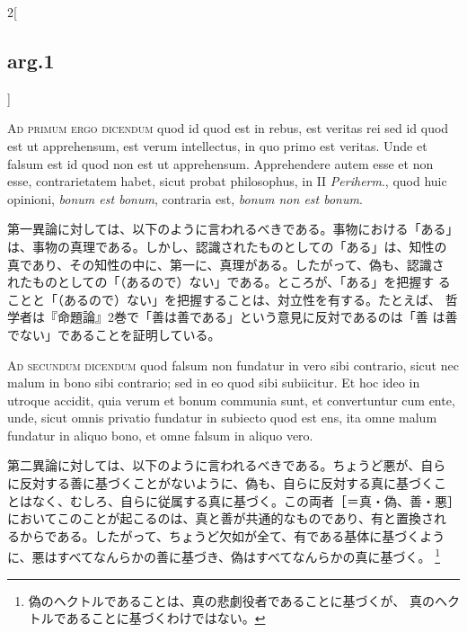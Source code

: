 \documentclass[paper=a4paper,fontsize=10pt,jafontsize=9pt,titlepage]{jlreq}
\begin{document}
\begin{paracol}{2}[\subsection{arg.1}]
\switchcolumn*[\subsection{ad.1}]


{\scshape Ad primum ergo dicendum} quod id quod est in rebus, est
 veritas rei sed id quod est ut apprehensum, est verum intellectus, in
 quo primo est veritas. Unde et falsum est id quod non est ut
 apprehensum. Apprehendere autem esse et non esse, contrarietatem
 habet, sicut probat philosophus, in II {\itshape Periherm}., quod
 huic opinioni, {\itshape bonum est bonum}, contraria est, {\itshape
 bonum non est bonum}.

\switchcolumn

第一異論に対しては、以下のように言われるべきである。事物における「ある」
は、事物の真理である。しかし、認識されたものとしての「ある」は、知性の
真であり、その知性の中に、第一に、真理がある。したがって、偽も、認識さ
れたものとしての「（あるので）ない」である。ところが、「ある」を把握す
ることと「（あるので）ない」を把握することは、対立性を有する。たとえば、
哲学者は『命題論』2巻で「善は善である」という意見に反対であるのは「善
は善でない」であることを証明している。

\switchcolumn*[\subsection{ad.2}]


{\scshape Ad secundum dicendum} quod falsum non fundatur in vero sibi
 contrario, sicut nec malum in bono sibi contrario; sed in eo quod
 sibi subiicitur. Et hoc ideo in utroque accidit, quia verum et bonum
 communia sunt, et convertuntur cum ente, unde, sicut omnis privatio
 fundatur in subiecto quod est ens, ita omne malum fundatur in aliquo
 bono, et omne falsum in aliquo vero.

\switchcolumn

第二異論に対しては、以下のように言われるべきである。ちょうど悪が、自ら
に反対する善に基づくことがないように、偽も、自らに反対する真に基づくこ
とはなく、むしろ、自らに従属する真に基づく。この両者［＝真・偽、善・悪］
においてこのことが起こるのは、真と善が共通的なものであり、有と置換され
るからである。したがって、ちょうど欠如が全て、有である基体に基づくよう
に、悪はすべてなんらかの善に基づき、偽はすべてなんらかの真に基づく。
\footnote{偽のヘクトルであることは、真の悲劇役者であることに基づくが、
真のヘクトルであることに基づくわけではない。}

\switchcolumn*[\subsection{ad.3}]



\end{paracol}
\end{document}
